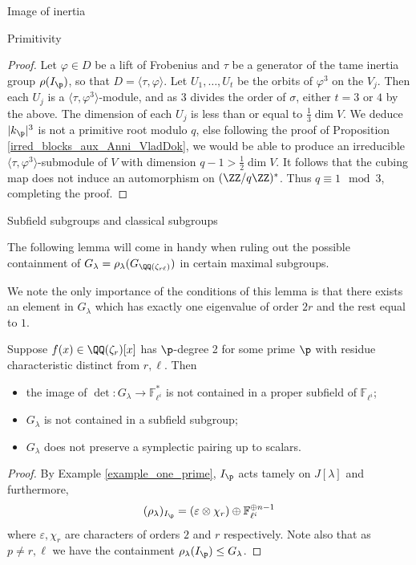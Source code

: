 \documentclass[11pt,a4paper]{article}
\newcommand{\Fli}{\mathbb{F}_{\ell^i}}
\newcommand{\Qr}{{\QQ(\zeta_r)}}
\newcommand{\GQrl}{G_{\QQ(\zeta_{r\ell})}}
\newcommand{\Glam}{G_{\lambda}}
\begin{document}
\begin{section}{Image of inertia}
\begin{subsection}{Primitivity}
\begin{proof}
Let $\varphi \in D$ be a lift of Frobenius and $\tau$ be a generator of the tame inertia group $\rho(I_\p)$, so that $D = \langle \tau, \varphi \rangle$.
Let $U_1, \ldots,U_t$ be the orbits of $\varphi^3$ on the $V_j$.
Then each $U_j$ is a $\langle \tau, \varphi^3 \rangle$-module, and as $3$ divides the order of $\sigma$, either $t=3$ or $4$ by the above. The dimension of each $U_j$ is less than or equal to $\frac{1}{3} \dim V$.
We deduce $|k_\p|^3$ is not a primitive root modulo $q$, else following the proof of Proposition \ref{irred_blocks_aux_Anni_VladDok}, we would be able to produce an irreducible $\langle \tau, \varphi^3 \rangle$-submodule of $V$ with dimension $q-1> \frac{1}{2} \dim V$.
It follows that the cubing map does not induce an automorphism on $(\ZZ/q\ZZ)^*$.
Thus $q\equiv 1 \mod{3}$, completing the proof.
\end{proof}
\end{subsection}

\begin{subsection}{Subfield subgroups and classical subgroups}
    \label{ss:ruling_out_subfield_sbgps_and_classical_sbgps}


The following lemma will come in handy when ruling out the possible containment of $\Glam = \rho_\lambda(\GQrl)$ in certain maximal subgroups.

We note the only importance of the conditions of this lemma is that there exists an element in $G_\lambda$ which has exactly one eigenvalue of order $2r$ and the rest equal to $1$. 

\begin{lemma}
\label{lemma_not_subfld_sbgp_not_in_GSp_n}
Suppose $f(x) \in \Qr[x]$ has $\p$-degree 2 for some prime $\p$ with residue characteristic distinct from $ r,\ell$.
Then \begin{itemize}
    \item the image of $\det\colon G_\lambda \rightarrow \Fli^*$ is not contained in a proper subfield of $\Fli$;
    \item $G_\lambda$ is not contained in a subfield subgroup;
    \item $G_\lambda$ does not preserve a symplectic pairing up to scalars.
\end{itemize}
\end{lemma}
\begin{proof}
By Example \ref{example_one_prime},  $I_\p$ acts tamely on $J[\lambda]$ and furthermore,
\[(\rho_\lambda)_{I_\p} = (\varepsilon \otimes \chi_r ) \oplus \Fli^{\oplus n-1}\] where $\varepsilon, \chi_r$ are characters of orders $2$ and $r$ respectively. Note also that as $p \neq r,\ell$ we have the containment $\rho_\lambda(I_\p) \leq \Glam$.


\end{proof}
\end{subsection}
\end{section}
\end{document}
